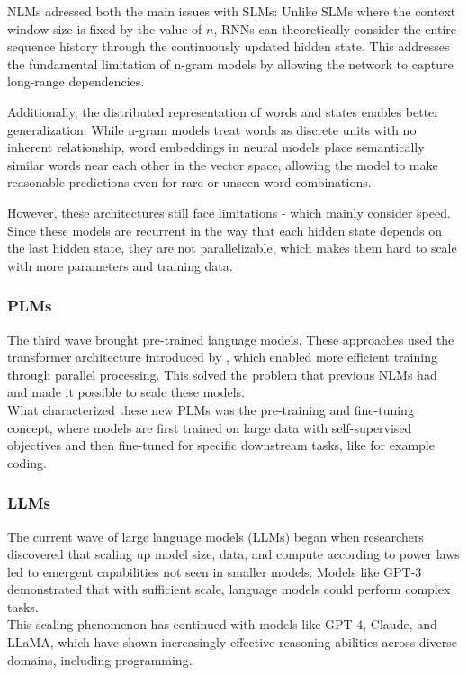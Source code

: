\documentclass[%
thesis=student,%
coverpage=false,%
titlepage=false,%
headmarks=true, %
english,%
font=libertine, %
math=newpxtx, %
BCOR=5mm,%
coverBCOR=11mm%
]{tum-templates/book/tumbook}
\begin{document}
NLMs adressed both the main issues with SLMs: Unlike SLMs where the context window size is fixed by the value of $n$, RNNs can theoretically consider the entire sequence history through the continuously updated hidden state. This addresses the fundamental limitation of n-gram models by allowing the network to capture long-range dependencies.

Additionally, the distributed representation of words and states enables better generalization. While n-gram models treat words as discrete units with no inherent relationship, word embeddings in neural models place semantically similar words near each other in the vector space, allowing the model to make reasonable predictions even for rare or unseen word combinations.

However, these architectures still face limitations - which mainly consider speed. Since these models are recurrent in the way that each hidden state depends on the last hidden state, they are not parallelizable, which makes them hard to scale with more parameters and training data.

\subsubsection{PLMs}

The third wave brought pre-trained language models. These approaches used the transformer architecture introduced by \textcite{Vaswani2017}, which enabled more efficient training through parallel processing. This solved the problem that previous NLMs had and made it possible to scale these models.\\
What characterized these new PLMs was the pre-training and fine-tuning concept, where models are first trained on large data with self-supervised objectives and then fine-tuned for specific downstream tasks, like for example coding.

\subsubsection{LLMs}


The current wave of large language models (LLMs) began when researchers discovered that scaling up model size, data, and compute according to power laws led to emergent capabilities not seen in smaller models. Models like GPT-3 demonstrated that with sufficient scale, language models could perform complex tasks. \cite{OpenAI2022} \\
This scaling phenomenon has continued with models like GPT-4, Claude, and LLaMA, which have shown increasingly effective reasoning abilities across diverse domains, including programming. \\
\end{document}
